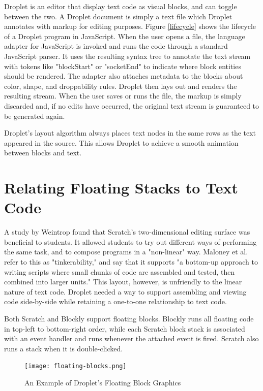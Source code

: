 \documentclass[conference]{IEEEtran}
\begin{document}
Droplet is an editor that display text code as visual blocks, and can toggle between the two. A Droplet document is simply a text file which Droplet annotates with markup for editing purposes. Figure \ref{lifecycle} shows the lifecycle of a Droplet program in JavaScript. When the user opens a file, the language adapter for JavaScript is invoked and runs the code through a standard JavaScript parser. It uses the resulting syntax tree to annotate the text stream with tokens like "blockStart" or "socketEnd" to indicate where block entities should be rendered. The adapter also attaches metadata to the blocks about color, shape, and droppability rules. Droplet then lays out and renders the resulting stream. When the user saves or runs the file, the markup is simply discarded and, if no edits have occurred, the original text stream is guaranteed to be generated again.

Droplet's layout algorithm always places text nodes in the same rows as the text appeared in the source. This allows Droplet to achieve a smooth animation between blocks and text.

\section{Relating Floating Stacks to Text Code}

A study by Weintrop \cite{Weintrop} found that Scratch's two-dimensional editing surface was beneficial to students. It allowed students to try out different ways of performing the same task, and to compose programs in a "non-linear" way. Maloney et al. \cite{Maloney} refer to this as "tinkerability," and say that it supports "a bottom-up approach to writing scripts where small chunks of code are assembled and tested, then combined into larger units." This layout, however, is unfriendly to the linear nature of text code. Droplet needed a way to support assembling and viewing code side-by-side while retaining a one-to-one relationship to text code.

Both Scratch and Blockly support floating blocks. Blockly runs all floating code in top-left to bottom-right order, while each Scratch block stack is associated with an event handler and runs whenever the attached event is fired. Scratch also runs a stack when it is double-clicked.

\begin{figure}
\centering
\texttt{[image: floating-blocks.png]}
\caption{An Example of Droplet's Floating Block Graphics}
\label{floating}
\end{figure}
\end{document}
